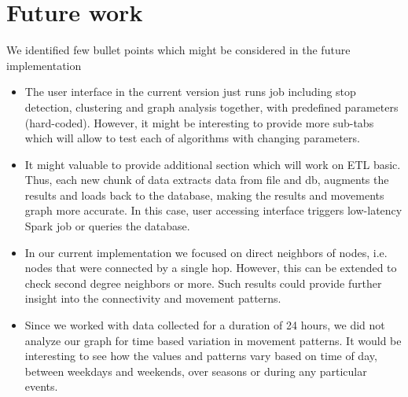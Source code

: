 \chapter{Future work}
\label{cha:future}

We identified few bullet points which might be considered in the future implementation

\begin{itemize}  
\item The user interface in the current version just runs job including stop detection, clustering and graph analysis together, with predefined parameters (hard-coded). However, it might be interesting to provide more sub-tabs which will allow to test each of algorithms with changing parameters. 
\item It might valuable to provide additional section which will work on ETL basic. Thus, each new chunk of data extracts data from file and db, augments the results and loads back to the database, making the results and movements graph more accurate. In this case, user accessing interface triggers low-latency Spark job or queries the database.
\item In our current implementation we focused on direct neighbors of nodes, i.e. nodes that were connected by a single hop. However, this can be extended to check second degree neighbors or more. Such results could provide further insight into the connectivity and movement patterns.
\item Since we worked with data collected for a duration of 24 hours, we did not analyze our graph for time based variation in movement patterns. It would be interesting to see how the values and patterns vary based on time of day, between weekdays and weekends, over seasons or during any particular events.
\end{itemize}